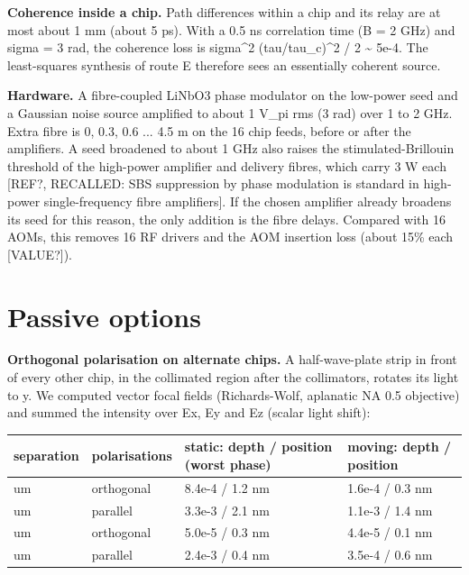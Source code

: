 \textbf{Coherence inside a chip.} Path differences within a chip and its
relay are at most about 1 mm (about 5 ps). With a 0.5 ns correlation
time (B = 2 GHz) and sigma = 3 rad, the coherence loss is sigma\^{}2
(tau/tau\_c)\^{}2 / 2 \textasciitilde{} 5e-4. The least-squares
synthesis of route E therefore sees an essentially coherent source.

\textbf{Hardware.} A fibre-coupled LiNbO3 phase modulator on the
low-power seed and a Gaussian noise source amplified to about 1 V\_pi
rms (3 rad) over 1 to 2 GHz. Extra fibre is 0, 0.3, 0.6 ... 4.5 m on the
16 chip feeds, before or after the amplifiers. A seed broadened to about
1 GHz also raises the stimulated-Brillouin threshold of the high-power
amplifier and delivery fibres, which carry 3 W each {[}REF?, RECALLED:
SBS suppression by phase modulation is standard in high-power
single-frequency fibre amplifiers{]}. If the chosen amplifier already
broadens its seed for this reason, the only addition is the fibre
delays. Compared with 16 AOMs, this removes 16 RF drivers and the AOM
insertion loss (about 15\% each {[}VALUE?{]}).

\hypertarget{4-passive-options}{%
\section{Passive options}\label{row_coherence-4-passive-options}}

\textbf{Orthogonal polarisation on alternate chips.} A half-wave-plate
strip in front of every other chip, in the collimated region after the
collimators, rotates its light to y. We computed vector focal fields
(Richards-Wolf, aplanatic NA 0.5 objective) and summed the intensity
over Ex, Ey and Ez (scalar light shift):

{\small
\begin{longtable}[]{@{}>{\raggedright\arraybackslash}p{0.222\dimexpr(\linewidth-8\tabcolsep)\relax}>{\raggedright\arraybackslash}p{0.286\dimexpr(\linewidth-8\tabcolsep)\relax}>{\raggedright\arraybackslash}p{0.302\dimexpr(\linewidth-8\tabcolsep)\relax}>{\raggedright\arraybackslash}p{0.190\dimexpr(\linewidth-8\tabcolsep)\relax}@{}}
\toprule\noalign{}
separation & polarisations & static: depth / position (worst phase) &
moving: depth / position \\
\midrule\noalign{}
\endhead
\bottomrule\noalign{}
\endlastfoot
4 um & orthogonal & 8.4e-4 / 1.2 nm & 1.6e-4 / 0.3 nm \\
8 um & parallel & 3.3e-3 / 2.1 nm & 1.1e-3 / 1.4 nm \\
12 um & orthogonal & 5.0e-5 / 0.3 nm & 4.4e-5 / 0.1 nm \\
16 um & parallel & 2.4e-3 / 0.4 nm & 3.5e-4 / 0.6 nm \\
\end{longtable}
}

